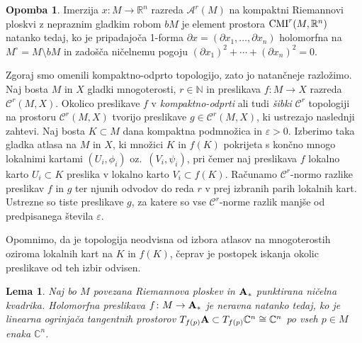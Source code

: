 \documentclass[12pt,a4paper,twoside]{article}
\theoremstyle{definition} %
\newtheorem{opomba}[definicija]{Opomba}
\theoremstyle{plain} %
\newtheorem{lema}[definicija]{Lema}
\numberwithin{equation}{section}  %
\newcommand{\R}{\mathbb R}
\newcommand{\C}{\mathbb C}
\begin{document}
\begin{opomba}
Imerzija $x \colon M \to \mathbb{R}^{n}$ razreda $\mathcal{A}^{r}(M)$ na kompaktni Riemannovi ploskvi z nepraznim gladkim robom $bM$ je element prostora $\textup{CMI}^{r}(M, \R^{n})$ natanko tedaj, ko je pripadajoča 1-forma $\partial x = (\partial x_{1}, \dots , \partial x_{n})$ holomorfna na $M^{\circ} = M \setminus bM$ in zadošča ničelnemu pogoju $(\partial{x_1})^2 + \cdots + (\partial{x_n})^2 = 0$.
\end{opomba}

Zgoraj smo omenili kompaktno-odprto topologijo, zato jo natančneje razložimo.
Naj bosta $M$ in $X$ gladki mnogoterosti, $r \in \mathbb{N}$ in preslikava $f \colon M \to X$ razreda $\mathcal{C}^{r}(M,X)$. 
Okolico preslikave $f$ v \emph{kompaktno-odprti} ali tudi \emph{šibki} $\mathcal{C}^{r}$ topologiji na prostoru $\mathcal{C}^{r}(M,X)$ tvorijo preslikave $g \in \mathcal{C}^{r}(M,X)$, ki ustrezajo naslednji zahtevi. 
Naj bosta $K \subset M$ dana kompaktna podmnožica in $\varepsilon > 0$. Izberimo taka gladka atlasa na $M$ in $X$, ki množici $K$ in $f(K)$ pokrijeta s končno mnogo lokalnimi kartami $(U_{i}, \phi_{i})$ oz.~$(V_{i}, \psi_{i})$, pri čemer naj preslikava $f$ lokalno karto $U_{i} \subset K$ preslika v lokalno karto $V_{i} \subset f(K)$. 
Računamo $\mathcal{C}^{r}$-normo razlike preslikav $f$ in $g$ ter njunih odvodov do reda $r$ v prej izbranih parih lokalnih kart. Ustrezne so tiste preslikave $g$, za katere so vse $\mathcal{C}^{r}$-norme razlik manjše od predpisanega števila $\varepsilon$.

Opomnimo, da je topologija neodvisna od izbora atlasov na mnogoterostih oziroma lokalnih kart na $K$ in $f(K)$, čeprav je postopek iskanja okolic preslikave od teh izbir odvisen.

\begin{lema} \label{lema:neravna f}
Naj bo $M$ povezana Riemannova ploskev in $\textbf{\textup{A}}_{*}$ punktirana ničelna kvadrika.
Holomorfna preslikava $f \colon M \to \textbf{\textup{A}}_{*}$ je neravna natanko tedaj, ko je linearna ogrinjača tangentnih prostorov 
$T_{f(p)} \textbf{\textup{A}} \subset T_{f(p)} \C^{n} \cong \mathbb{C}^{n}$ po vseh $p \in M$ enaka $\C^{n}$.
\end{lema}
\end{document}
